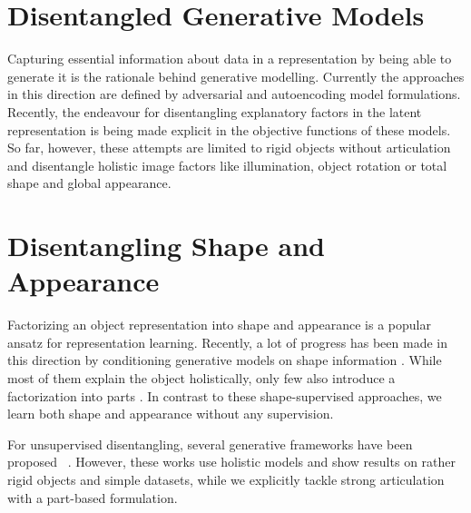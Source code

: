 \section{Disentangled Generative Models}
	Capturing essential information about data in a representation by being able to generate it is the rationale behind generative modelling. Currently the approaches in this direction are defined by adversarial \cite{goodfellow16dlb} and autoencoding \cite{kingma13vae} model formulations. Recently, the endeavour for disentangling explanatory factors in the latent representation is being made explicit in the objective functions \cite{burgess18betavae, chen16infogan} of these models. So far, however, these attempts are limited to rigid objects without articulation and disentangle holistic image factors like illumination, object rotation or total shape and global appearance. \cite{denton17disvideo} \ %

\section{Disentangling Shape and Appearance}
	Factorizing an object representation into shape and appearance is a popular ansatz for representation learning.
	Recently, a lot of progress has been made in this direction by conditioning generative models on shape information \cite{esser18, ma17poseguided, debem18dgpose, ma17disperson, siarohin18deformgan, balakrishnan18unseenposes}.
	While most of them explain the object holistically, only few also introduce a factorization into parts \cite{siarohin18deformgan, balakrishnan18unseenposes}.
	In contrast to these shape-supervised approaches, we learn both shape and appearance without any supervision.

	For unsupervised disentangling, several generative frameworks have been proposed ~\cite{higgins16betavae, chen16infogan, li18analogy, denton17disvideo, shu18shapeappear, xing18shapeappear}.
	However, these works use holistic models and show results on rather rigid objects and simple datasets, while we explicitly tackle strong articulation with a part-based formulation.

